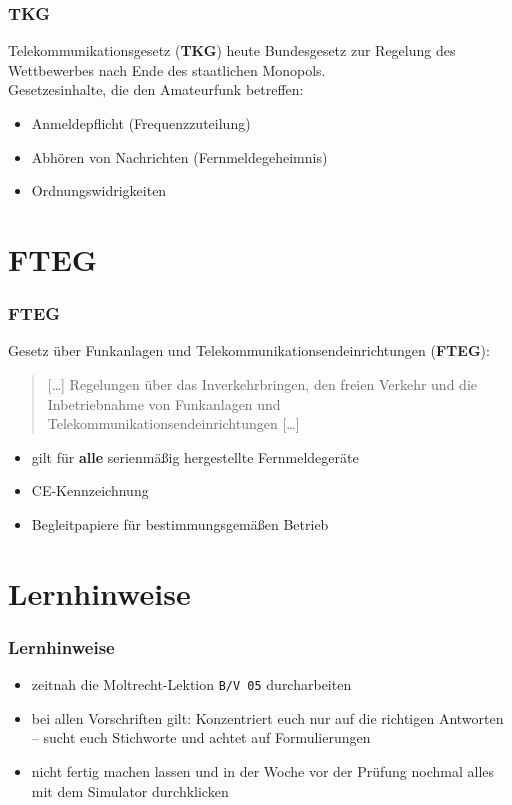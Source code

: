 \begin{frame}
  \frametitle{TKG}

  Telekommunikationsgesetz (\textbf{TKG}) heute Bundesgesetz zur Regelung des
  Wettbewerbes nach Ende des staatlichen Monopols. \\[1em]

  Gesetzesinhalte, die den Amateurfunk betreffen:

  \begin{itemize}
    \item Anmeldepflicht (Frequenzzuteilung)
    \item Abhören von Nachrichten (Fernmeldegeheimnis)
    \item Ordnungswidrigkeiten
  \end{itemize}

\end{frame}

\section{FTEG}

\begin{frame}
  \frametitle{FTEG}

  Gesetz über Funkanlagen und Telekommunikationsendeinrichtungen
  (\textbf{FTEG}): \\[2em]

  \begin{quote}
    [\ldots] Regelungen über das Inverkehrbringen, den freien Verkehr
    und die Inbetriebnahme von Funkanlagen und
    Telekommunikationsendeinrichtungen [\ldots]
  \end{quote}

  \begin{itemize}
    \item gilt für \textbf{alle} serienmäßig hergestellte Fernmeldegeräte
    \item CE-Kennzeichnung
    \item Begleitpapiere für bestimmungsgemäßen Betrieb
  \end{itemize}

\end{frame}

\section{Lernhinweise}

\begin{frame}
  \frametitle{Lernhinweise}

  \begin{itemize}
    \item zeitnah die Moltrecht-Lektion \texttt{B/V 05} durcharbeiten
    \item bei allen Vorschriften gilt: Konzentriert euch nur auf die
      richtigen Antworten -- sucht euch Stichworte und achtet auf
      Formulierungen
    \item nicht fertig machen lassen und in der Woche vor der Prüfung
      nochmal alles mit dem Simulator durchklicken
  \end{itemize}

\end{frame}

